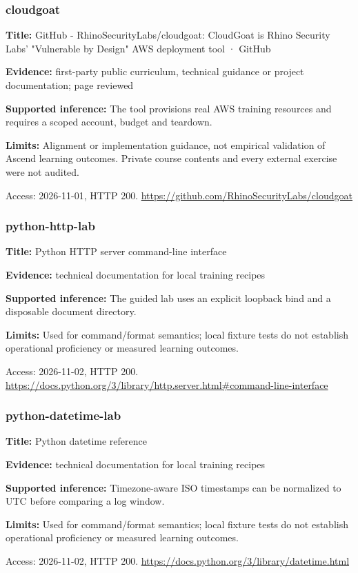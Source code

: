 \subsubsection{cloudgoat}
\noindent\textbf{Title:} GitHub - RhinoSecurityLabs/cloudgoat: CloudGoat is Rhino Security Labs' "Vulnerable by Design" AWS deployment tool · GitHub\par
\noindent\textbf{Evidence:} first-party public curriculum, technical guidance or project documentation; page reviewed\par
\noindent\textbf{Supported inference:} The tool provisions real AWS training resources and requires a scoped account, budget and teardown.\par
\noindent\textbf{Limits:} Alignment or implementation guidance, not empirical validation of Ascend learning outcomes. Private course contents and every external exercise were not audited.\par
\noindent Access: 2026-11-01, HTTP 200. \url{https://github.com/RhinoSecurityLabs/cloudgoat}
\subsubsection{python-http-lab}
\noindent\textbf{Title:} Python HTTP server command-line interface\par
\noindent\textbf{Evidence:} technical documentation for local training recipes\par
\noindent\textbf{Supported inference:} The guided lab uses an explicit loopback bind and a disposable document directory.\par
\noindent\textbf{Limits:} Used for command/format semantics; local fixture tests do not establish operational proficiency or measured learning outcomes.\par
\noindent Access: 2026-11-02, HTTP 200. \url{https://docs.python.org/3/library/http.server.html#command-line-interface}
\subsubsection{python-datetime-lab}
\noindent\textbf{Title:} Python datetime reference\par
\noindent\textbf{Evidence:} technical documentation for local training recipes\par
\noindent\textbf{Supported inference:} Timezone-aware ISO timestamps can be normalized to UTC before comparing a log window.\par
\noindent\textbf{Limits:} Used for command/format semantics; local fixture tests do not establish operational proficiency or measured learning outcomes.\par
\noindent Access: 2026-11-02, HTTP 200. \url{https://docs.python.org/3/library/datetime.html}
